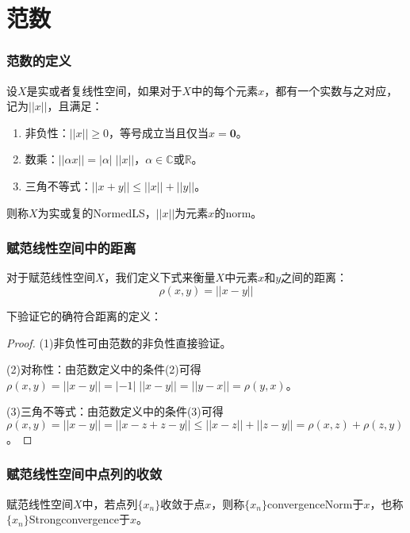 \section{范数}
\subsubsection{范数的定义}
\begin{definition}
	设$X$是实或者复线性空间，如果对于$X$中的每个元素$x$，都有一个实数与之对应，记为$||x||$，且满足：
	\begin{enumerate}
		\item 非负性：$||x||\geqslant 0$，等号成立当且仅当$x=\mathbf{0}$。
		\item 数乘：$||\alpha x||=|\alpha|\;||x||$，$\alpha\in\mathbb{C}$或$\mathbb{R}$。
		\item 三角不等式：$||x+y||\leqslant||x||+||y||$。
	\end{enumerate}
	则称$X$为实或复的\gls{NormedLS}，$||x||$为元素$x$的\gls{norm}。
\end{definition}
\subsubsection{赋范线性空间中的距离}
\begin{definition}
	对于赋范线性空间$X$，我们定义下式来衡量$X$中元素$x$和$y$之间的距离：
	\begin{equation*}
		\rho(x,y)=||x-y||
	\end{equation*}
\end{definition}
下验证它的确符合距离的定义：
\begin{proof}
	(1)非负性可由范数的非负性直接验证。\par
	(2)对称性：由范数定义中的条件(2)可得$\rho(x,y)=||x-y||=|-1|\;||x-y||=||y-x||=\rho(y,x)$。\par
	(3)三角不等式：由范数定义中的条件(3)可得$\rho(x,y)=||x-y||=||x-z+z-y||\leqslant||x-z||+||z-y||=\rho(x,z)+\rho(z,y)$。
\end{proof}
\subsubsection{赋范线性空间中点列的收敛}
\begin{definition}
	赋范线性空间$X$中，若点列$\{x_n\}$收敛于点$x$，则称$\{x_n\}$\gls{convergenceNorm}于$x$，也称$\{x_n\}$\gls{Strongconvergence}于$x$。
\end{definition}
